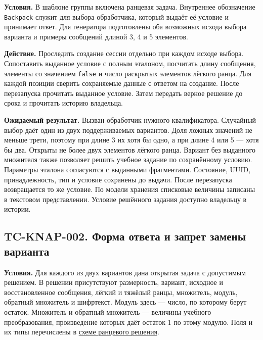 \documentclass[12pt,a4paper]{article}
\begin{document}
\hypertarget{tc-knap-001}{}

\textbf{Условия.} В шаблоне группы включена ранцевая задача. Внутреннее обозначение \texttt{Backpack} служит для выбора обработчика, который выдаёт её условие и принимает ответ. Для генератора подготовлены оба возможных исхода выбора варианта и примеры сообщений длиной 3, 4 и 5 элементов.

\textbf{Действие.} Проследить создание сессии отдельно при каждом исходе выбора. Сопоставить выданное условие с полным эталоном, посчитать длину сообщения, элементы со значением \texttt{false} и число раскрытых элементов лёгкого ранца. Для каждой позиции сверить сохраняемые данные с ответом на создание. После перезапуска прочитать выданное условие. Затем передать верное решение до срока и прочитать историю владельца.

\textbf{Ожидаемый результат.} Вызван обработчик нужного квалификатора. Случайный выбор даёт один из двух поддерживаемых вариантов. Доля ложных значений не меньше трети, поэтому при длине 3 их хотя бы одно, а при длине 4 или 5 --- хотя бы два. Открыты не более двух элементов лёгкого ранца. Вариант без выданного множителя также позволяет решить учебное задание по сохранённому условию. Параметры эталона согласуются с выданными фрагментами. Состояние, UUID, принадлежность, тип и условие сохранены до выдачи. После перезапуска возвращается то же условие. По модели хранения списковые величины записаны в текстовом представлении. Условие решённого задания доступно владельцу в истории.

\subsection{TC-KNAP-002. Форма ответа и запрет замены варианта}\label{tc-knap-002-ux444ux43eux440ux43cux430-ux43eux442ux432ux435ux442ux430-ux438-ux437ux430ux43fux440ux435ux442-ux437ux430ux43cux435ux43dux44b-ux432ux430ux440ux438ux430ux43dux442ux430}

\hypertarget{tc-knap-002-форма-ответа-и-запрет-замены-варианта}{}

\hypertarget{tc-knap-002}{}

\textbf{Условия.} Для каждого из двух вариантов дана открытая задача с допустимым решением. В решении присутствуют размерность, вариант, исходное и восстановленное сообщения, лёгкий и тяжёлый ранцы, множитель, модуль, обратный множитель и шифртекст. Модуль здесь --- число, по которому берут остаток. Множитель и обратный множитель --- величины учебного преобразования, произведение которых даёт остаток 1 по этому модулю. Поля и их типы перечислены в {\href{../07\_Программные\_требования/DOC-06.2\_Сессии\_задач\_и\_планировщик.pdf\#ранцевая-задача}{схеме ранцевого решения}}.
\end{document}
